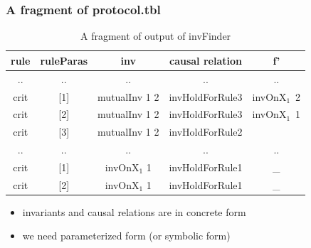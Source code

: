 \documentclass{beamer}
\begin{document}
\begin{frame}\frametitle{A fragment of protocol.tbl}
 \begin{table}[!t]
\centering \caption{A fragment of output of {\sf invFinder}}\label{label-ground-causal relation} %
\begin{tabular}{|c|c|c|c|c|  }
\hline
  rule& ruleParas&inv&causal relation &   f'  \\
\hline
  .. & ..&.. &..&.. \\

\hline
  crit  & [1]&mutualInv 1 2& invHoldForRule3 &invOnX$_1$~2 \\
\hline
  crit &[2]& mutualInv 1 2& invHoldForRule3 &invOnX$_1$~1  \\
\hline
  crit & [3]& mutualInv 1 2 & invHoldForRule2  & \\
\hline
  .. & ..&.. &..&.. \\

\hline
  crit  & [1]&invOnX$_1$ 1 & invHoldForRule1 &\_ \\
\hline
  crit &[2]& invOnX$_1$ 1 & invHoldForRule1 &\_  \\
\hline
\end{tabular}
\end{table}
\begin{itemize}
\item invariants and causal relations are in concrete form
\item we need parameterized form (or symbolic form)



\end{itemize}
\end{frame}
\end{document}
